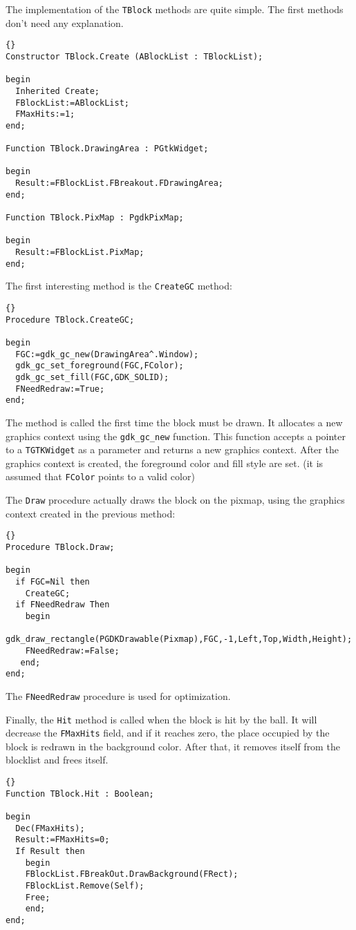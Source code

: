\documentclass[10pt]{article}
\newcommand{\var}[1]{\texttt{#1}}
\begin{document}
The implementation of the \var{TBlock} methods are quite simple. The first
methods don't need any explanation.
\begin{lstlisting}{}
Constructor TBlock.Create (ABlockList : TBlockList);

begin
  Inherited Create;
  FBlockList:=ABlockList;
  FMaxHits:=1;
end;

Function TBlock.DrawingArea : PGtkWidget;

begin
  Result:=FBlockList.FBreakout.FDrawingArea;
end;

Function TBlock.PixMap : PgdkPixMap; 

begin
  Result:=FBlockList.PixMap;
end;
\end{lstlisting}{}
The first interesting method is the \var{CreateGC} method:
\begin{lstlisting}{}
Procedure TBlock.CreateGC;

begin
  FGC:=gdk_gc_new(DrawingArea^.Window);
  gdk_gc_set_foreground(FGC,FColor);
  gdk_gc_set_fill(FGC,GDK_SOLID);
  FNeedRedraw:=True;
end;
\end{lstlisting}{}
The method is called the first time the block must be drawn. It allocates a
new graphics context using the \var{gdk\_gc\_new} function. This function
accepts a pointer to a \var{TGTKWidget} as a parameter and returns a new
graphics context. After the graphics context is created, the foreground
color and fill style are set. (it is assumed that \var{FColor} points
to a valid color)

The \var{Draw} procedure actually draws the block on the pixmap, using 
the graphics context created in the previous method:
\begin{lstlisting}{}
Procedure TBlock.Draw;

begin
  if FGC=Nil then
    CreateGC;
  if FNeedRedraw Then
    begin
    gdk_draw_rectangle(PGDKDrawable(Pixmap),FGC,-1,Left,Top,Width,Height);
    FNeedRedraw:=False;
   end;
end;
\end{lstlisting}{}
The \var{FNeedRedraw} procedure is used for optimization.

Finally, the \var{Hit} method is called when the block is hit by the ball.
It will decrease the \var{FMaxHits} field, and if it reaches zero, the 
place occupied by the block is redrawn in the background color. After that,
it removes itself from the blocklist and frees itself.
\begin{lstlisting}{}
Function TBlock.Hit : Boolean;

begin
  Dec(FMaxHits);
  Result:=FMaxHits=0;
  If Result then
    begin
    FBlockList.FBreakOut.DrawBackground(FRect);
    FBlockList.Remove(Self);
    Free;
    end;
end;
\end{lstlisting}{}
\end{document}
